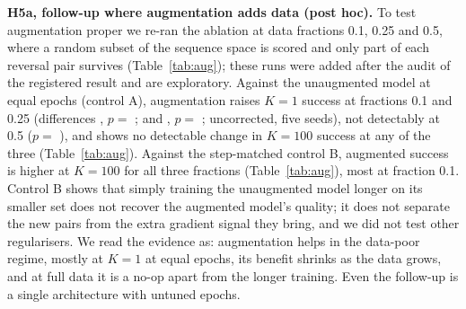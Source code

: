 \textbf{H5a, follow-up where augmentation adds data (post hoc).} To test augmentation proper we re-ran the ablation at data fractions 0.1, 0.25 and 0.5, where a random subset of the sequence space is scored and only part of each reversal pair survives (Table~\ref{tab:aug}); these runs were added after the audit of the registered result and are exploratory. Against the unaugmented model at equal epochs (control A), augmentation raises $K=1$ success at fractions 0.1 and 0.25 (differences , $p=$ ; and , $p=$ ; uncorrected, five seeds), not detectably at 0.5 ($p=$ ), and shows no detectable change in $K=100$ success at any of the three (Table~\ref{tab:aug}). Against the step-matched control B, augmented success is higher at $K=100$ for all three fractions (Table~\ref{tab:aug}), most at fraction 0.1. Control B shows that simply training the unaugmented model longer on its smaller set does not recover the augmented model's quality; it does not separate the new pairs from the extra gradient signal they bring, and we did not test other regularisers. We read the evidence as: augmentation helps in the data-poor regime, mostly at $K=1$ at equal epochs, its benefit shrinks as the data grows, and at full data it is a no-op apart from the longer training. Even the follow-up is a single architecture with untuned epochs.

